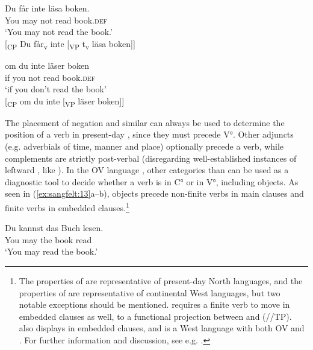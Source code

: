 \documentclass[output=paper, colorlinks, citecolor=brown]{langscibook}
\begin{document}
\ea {}\label{ex:sangfelt:12}
\begin{multicols}{2}\raggedcolumns
\ea \label{ex:sangfelt:12a}
\gll Du får inte läsa boken. \\
 You may not read book.\textsc{def}\\
\glt ‘You may not read the book.’\\

[\textsubscript{CP} Du får\textsubscript{v} inte [\textsubscript{VP} t\textsubscript{v} läsa boken]]\columnbreak

\ex\label{ex:sangfelt:12b}
\gll om du inte läser boken \\ 
 if you not read book.\textsc{def}\\
\glt ‘if you don’t read the book’\\

[\textsubscript{CP} om du inte [\textsubscript{VP} läser boken]]
\z 
\end{multicols}
\z 

The placement of negation and similar  can always be used to determine the position of a verb in present-day , since they must precede V°. Other adjuncts (e.g. adverbials of time, manner and place) optionally precede a verb, while complements are strictly post-verbal (disregarding well-established instances of leftward , like ). In the OV language , other categories than  can be used as a diagnostic tool to decide whether a verb is in C° or in V°, including objects. As seen in (\ref{ex:sangfelt:13}a–b), objects precede non-finite verbs in main clauses and finite verbs in embedded clauses.\footnote{The properties of  are representative of present-day North  languages, and the properties of  are representative of continental West  languages, but two notable exceptions should be mentioned.  requires a finite verb to move in embedded clauses as well, to a functional projection between  and  (//TP).  also displays  in embedded clauses, and is a West  language with both OV and . For further information and discussion, see e.g. \citet[3–18]{Vikner2001}.}

\ea {}\label{ex:sangfelt:13}
\ea\label{ex:sangfelt:13a}
\gll Du kannst das Buch lesen.\\
 You may the book read\\
\glt ‘You may read the book.’\\
\end{document}
